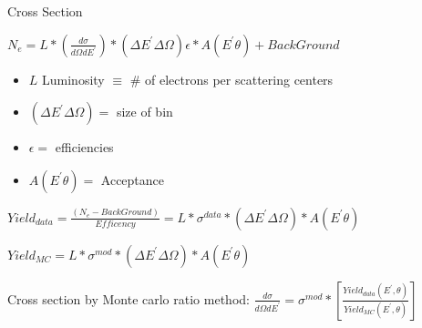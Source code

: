 \documentclass{beamer}
\begin{document}
\begin{frame}{Cross Section}
	\begin{block}{}
		\centering
		 $N_e = \textit{L} * \left( \frac{d\sigma}{d\Omega dE^\prime} \right) * \left( \Delta E^\prime \Delta \Omega\right) \epsilon * A \left(E^\prime \theta \right)  + Back  Ground$
		
		\begin{itemize}
			\item $\textit{L}$ Luminosity $\equiv$ \# of electrons per scattering centers
			\item $\left( \Delta E^\prime \Delta \Omega\right) = $ size of bin
			\item $\epsilon = $ efficiencies
			\item  $A \left(E^\prime \theta \right) =$ Acceptance 
			
		\end{itemize}
		
		$ Yield_{data} = \frac{\left(N_e - BackGround\right)}{Efficency } =  \textit{L} *\sigma^{data} * \left( \Delta E^\prime \Delta \Omega\right)*  A \left(E^\prime \theta \right)$
		
		$ Yield_{MC} = \textit{L} *\sigma^{mod} * \left( \Delta E^\prime \Delta \Omega\right)*  A \left(E^\prime \theta \right)$
	\end{block}



	\begin{center}

	\begin{block}{}
		Cross section by Monte carlo ratio  method:
\centering $ \frac{d\sigma}{d\Omega dE^\prime} = \sigma^{mod} * \left[\frac{Yield_{data} \left( 
E^\prime,\theta\right)} {Yield_{MC}\left(E^\prime,\theta\right)}\right] $

	\end{block}	
	\end{center}



\end{frame}
\end{document}
